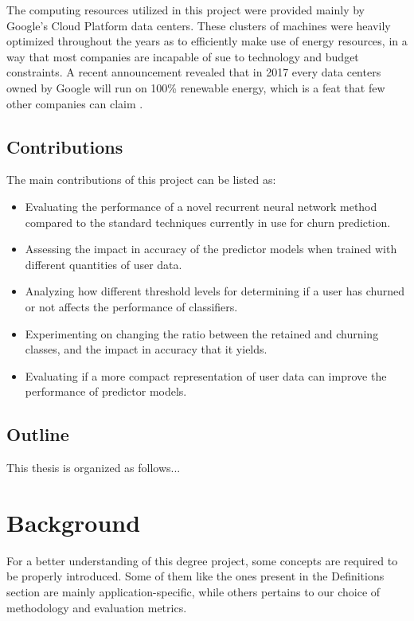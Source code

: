 \documentclass{kththesis}
\begin{document}
The computing resources utilized in this project were provided mainly by Google's Cloud Platform data centers. These clusters of machines were heavily optimized throughout the years as to efficiently make use of energy resources, in a way that most companies are incapable of sue to technology and budget constraints. A recent announcement revealed that in 2017 every data centers owned by Google will run on 100\% renewable energy, which is a feat that few other companies can claim \citep{google2017renew}.  


\section{Contributions}

The main contributions of this project can be listed as:

\begin{itemize}
\item Evaluating the performance of a novel recurrent neural network method compared to the standard techniques currently in use for churn prediction.
\item Assessing the impact in accuracy of the predictor models when trained with different quantities of user data.
\item Analyzing how different threshold levels for determining if a user has churned or not affects the performance of classifiers.
\item Experimenting on changing the ratio between the retained and churning classes, and the impact in accuracy that it yields.
\item Evaluating if a more compact representation of user data can improve the performance of predictor models.
\end{itemize}

\section{Outline}

This thesis is organized as follows... 

\chapter{Background}

For a better understanding of this degree project, some concepts are required to be properly introduced. Some of them like the ones present in the Definitions section are mainly application-specific, while others pertains to our choice of methodology and evaluation metrics.
\end{document}
